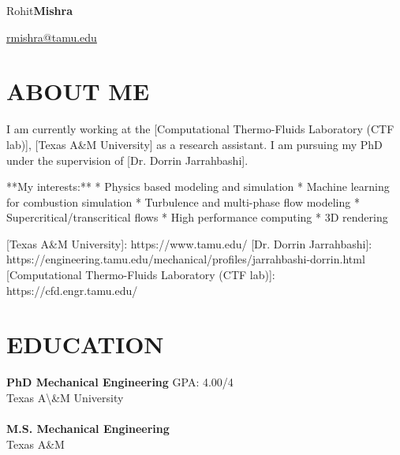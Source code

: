 \documentclass{res}
\begin{document}
	\hspace*{-0.05\textwidth}
	\begin{minipage}[t]{0.6\textwidth}
	\begin{flushleft}
	\vspace*{\fill}
	{\fontsize{45}{45}\selectfont Rohit\textbf{Mishra}}
	\end{flushleft}
	\end{minipage}
	\begin{minipage}[t]{0.44\textwidth}
	\begin{flushright}
	\href{mailto:rmishra@tamu.edu}{rmishra@tamu.edu} \\ 
	\end{flushright}
	\end{minipage}

	\begin{resume}
	
	
	\section{\MakeUppercase{About me}} \vskip 0.15in
	I am currently working at the [Computational Thermo-Fluids Laboratory (CTF lab)], [Texas A\&M University] as a research assistant. I am pursuing my PhD under the supervision of [Dr. Dorrin Jarrahbashi].

**My interests:**
* Physics based modeling and simulation
* Machine learning for combustion simulation
* Turbulence and multi-phase flow modeling
* Supercritical/transcritical flows
* High performance computing
* 3D rendering



[Texas A\&M University]: https://www.tamu.edu/
[Dr. Dorrin Jarrahbashi]: https://engineering.tamu.edu/mechanical/profiles/jarrahbashi-dorrin.html
[Computational Thermo-Fluids Laboratory (CTF lab)]: https://cfd.engr.tamu.edu/

	
	
	
	\section{\MakeUppercase{Education}} \vskip 0.15in
	
	{\bf PhD Mechanical Engineering} \hfill GPA: 4.00/4 \\
	{Texas A\textbackslash \&M University \hfill } \\ \\
	{\bf M.S. Mechanical Engineering} \hfill  \\
	{Texas A\&M \hfill } 
	

\end{resume}
\end{document}
